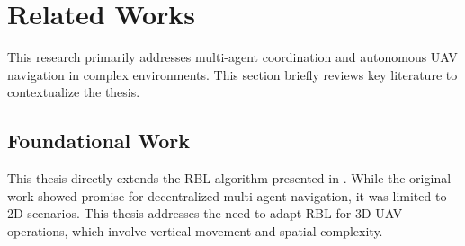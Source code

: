 \section{Related Works}

  This research primarily addresses multi-agent coordination and autonomous UAV navigation in complex environments. This section briefly reviews key literature to contextualize the thesis.
  \subsection{Foundational Work}
    This thesis directly extends the \ac{RBL} algorithm presented in \cite{rbl_paper}. 
    While the original work showed promise for decentralized multi-agent navigation, it was limited to \ac{2D} scenarios. 
    This thesis addresses the need to adapt \ac{RBL} for \ac{3D} \ac{UAV} operations, which involve vertical movement and spatial complexity.

